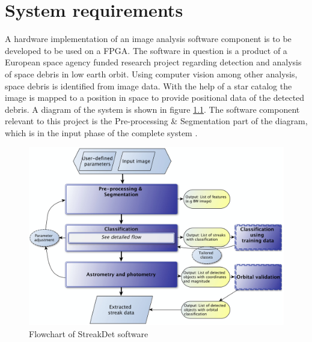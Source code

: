 \documentclass[12pt]{report}
\begin{document}

\chapter{System requirements}

A hardware implementation of an image analysis software component is to be developed to be used on a FPGA. The software in question is a product of a European space agency funded research project regarding detection and analysis of space debris in low earth orbit. Using computer vision among other analysis, space debris is identified from image data. With the help of a star catalog the image is mapped to a position in space to provide positional data of the detected debris. A diagram of the system is shown in figure \ref{fig:0}. The software component relevant to this project is the Pre-processing \& Segmentation part of the diagram, which is in the input phase of the complete system \citep{StreakDet} \citep{Starmatch}.

\begin{figure}[h]
    \centering
    \includegraphics[scale=0.2]{figures/streakdet.png}
    \caption{Flowchart of StreakDet software \citep{StreakDet}}
    \label{fig:0}
\end{figure}
\end{document}
